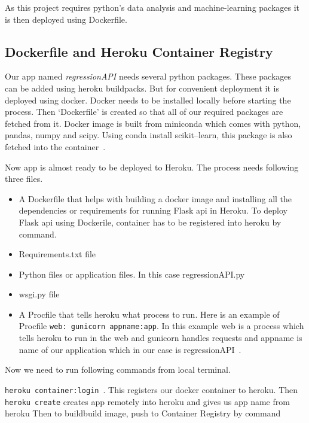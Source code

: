 As this project requires python's data analysis and machine-learning packages 
it is then deployed using Dockerfile. 

\subsection{Dockerfile and Heroku Container Registry}
 Our app named \textit{regressionAPI} needs several python packages. These
 packages can be added using heroku buildpacks. But for convenient deployment
 it is deployed using docker. Docker needs to be installed locally before 
 starting the process. Then `Dockerfile' is created  so that
 all of our required packages are fetched from it. Docker image is built from
 miniconda which comes with python, pandas, numpy and scipy. Using conda install
 scikit--learn, this package is also fetched into the 
 container~\cite{hid-sp18-415-dockerfile}.  

Now app is almost ready to be deployed to Heroku. The process needs
following three files.

\begin{itemize}
 \item A Dockerfile that helps with building a docker image and installing 
 all the dependencies or requirements for running Flask api in Heroku.
 To deploy Flask api using Dockerile, container has to be registered into 
 heroku by command. 
 \item Requirements.txt file~\cite{hid-sp18-415-regapp}
 \item Python files or application files. In this case regressionAPI.py
 \item wsgi.py file~\cite{hid-sp18-415-regapp}
 \item A Procfile that tells heroku what process to run. Here is an example 
 of Procfile \verb|web: gunicorn appname:app|. In this example web is a 
 process which tells heroku to run in the web and gunicorn handles requests
 and appname is name of our application which in our case is 
 regressionAPI~\cite{hid-sp18-415-regressionapi}.
 \end{itemize}
 
 Now we need to run following commands from local terminal.
 
 \verb|heroku container:login|~\cite{hid-sp18-415-heroku-com}. This registers
 our docker container to heroku. Then \verb|heroku create| creates app remotely
 into heroku and gives us app name from heroku
 Then to buildbuild image, push to Container Registry by command 

